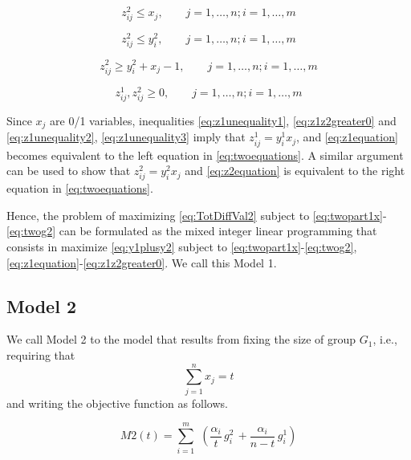 \begin{equation}
z_{ij}^2 \leq x_j, \quad \quad j=1,\dots,n; i=1,\dots, m
\label{eq:z2unequality1}
\end{equation}

\begin{equation}
z_{ij}^2 \leq y_i^2, \quad \quad j=1,\dots,n; i=1,\dots, m
\label{eq:zoom2unequality2}
\end{equation}

\begin{equation}
z_{ij}^2 \geq y_i^2+x_j-1, \quad \quad j=1,\dots,n; i=1,\dots, m
\label{eq:z2unequality3}
\end{equation}

\begin{equation}
z_{ij}^1, z_{ij}^2 \geq 0, \quad \quad j=1,\dots,n; i=1,\dots, m
\label{eq:z1z2greater0}
\end{equation}

Since \(x_j\) are 0/1 variables, inequalities \eqref{eq:z1unequality1}, \eqref{eq:z1z2greater0} and \eqref{eq:z1unequality2}, \eqref{eq:z1unequality3} imply that \(z_{ij}^1=y_i^1 x_j\), and \eqref{eq:z1equation} becomes equivalent to the left equation in \eqref{eq:twoequations}. A similar argument can be used to show that \(z_{ij}^2=y_i^2 x_j\) and \eqref{eq:z2equation} is equivalent to the right equation in \eqref{eq:twoequations}.

Hence, the problem of maximizing \eqref{eq:TotDiffVal2} subject to \eqref{eq:twopart1x}-\eqref{eq:twog2} can be formulated as the mixed integer linear programming that consists in maximize \eqref{eq:y1plusy2} subject to \eqref{eq:twopart1x}-\eqref{eq:twog2}, \eqref{eq:z1equation}-\eqref{eq:z1z2greater0}. We call this Model 1.

\subsection{Model 2}\label{Model2}

We call Model 2 to the model that results from fixing the size of group \(G_1\), i.e., requiring that
\begin{equation}
\sum_{j=1}^n x_j=t
\label{eq:T}
\end{equation}
and writing the objective function as follows.

\begin{equation}
M2(t) = \displaystyle{\sum_{i=1}^m}\,\,
\left(\frac{\alpha_{i}}{t} \, g_i^2
\,+
\frac{\alpha_{i}}{n-t} \, g_i^1 \right)
\label{eq:TotDiffVal2T}
\end{equation}


